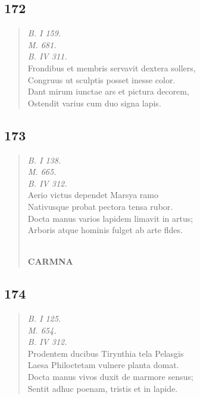 \documentclass[11pt, a4paper]{report}
\begin{document}
            \subsection*{172}
      \begin{verse}
      \textit{B. I 159.} \\ \textit{M. 681.} \\ \textit{B. IV 311.} \\ Frondibus et membris servavit dextera sollers, \\ Congruus ut sculptis posset inesse color. \\ Dant mirum iunctae ars et pictura decorem, \\ Ostendit varius cum duo signa lapis. \\ 
      \end{verse}
  
            \subsection*{173}
      \begin{verse}
      \textit{B. I 138.} \\ \textit{M. 665.} \\ \textit{B. IV 312.} \\ Aerio victus dependet Marsya ramo \\ Nativusque probat pectora tensa rubor. \\ Docta manus varios lapidem limavit in artus; \\ Arboris atque hominis fulget ab arte fldes. \\ 
        ﻿\pagebreak 
    \begin{center} \textbf{CARMNA} \end{center} \marginpar{[152]} 
      \end{verse}
  
            \subsection*{174}
      \begin{verse}
      \textit{B. I 125.} \\ \textit{M. 654.} \\ \textit{B. IV 312.} \\ Prodentem ducibus Tirynthia tela Pelasgis \\ Laesa Philoctetam vulnere planta domat. \\ Docta manus vivos duxit de marmore sensus; \\ Sentit adhuc poenam, tristis et in lapide. \\ 
      \end{verse}
  
\end{document}
